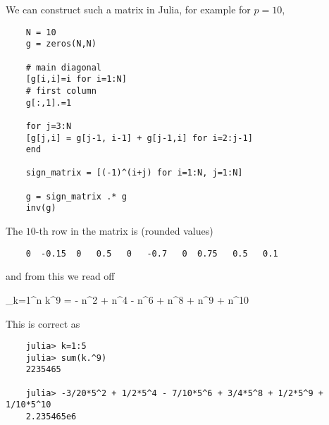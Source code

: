 We can construct such a matrix in Julia, for example for $p=10$,

\begin{verbatim}
    N = 10
    g = zeros(N,N)

    # main diagonal
    [g[i,i]=i for i=1:N]
    # first column
    g[:,1].=1

    for j=3:N
    [g[j,i] = g[j-1, i-1] + g[j-1,i] for i=2:j-1]
    end

    sign_matrix = [(-1)^(i+j) for i=1:N, j=1:N]

    g = sign_matrix .* g
    inv(g)
\end{verbatim}

The $10$-th row in the matrix is (rounded values)

\begin{verbatim}
    0  -0.15  0   0.5   0   -0.7   0  0.75   0.5   0.1
\end{verbatim}

and from this we read off

\bee
\sum_{k=1}^n k^{9} = -  n^2 +  n^4 -  n^6 +  n^8 +  n^9 +  n^{10}
\eee

This is correct as

\begin{verbatim}
    julia> k=1:5
    julia> sum(k.^9)
    2235465

    julia> -3/20*5^2 + 1/2*5^4 - 7/10*5^6 + 3/4*5^8 + 1/2*5^9 + 1/10*5^10
    2.235465e6
\end{verbatim}



